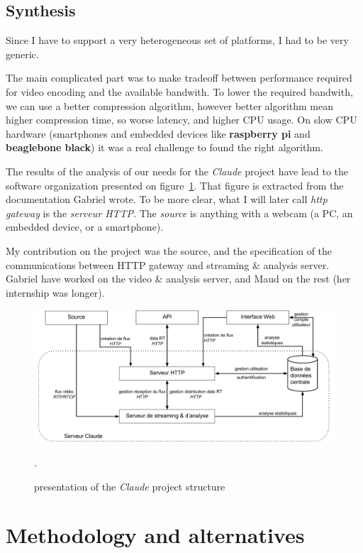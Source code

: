 \documentclass[a4paper,11pt]{custom}
\newcommand{\rpi}{\textbf{raspberry pi}\xspace}
\newcommand{\bbb}{\textbf{beaglebone black}\xspace}
\newcommand{\claude}{\textit{Claude}\xspace}
\begin{document}
\section{Synthesis}

Since I have to support a very heterogeneous set of platforms, I had to be very
generic.

The main complicated part was to make tradeoff between performance required for
video encoding and the available bandwith. To lower the required bandwith, we
can use a better compression algorithm, however better algorithm mean higher
compression time, so worse latency, and higher CPU usage. On slow CPU hardware
(smartphones and embedded devices like \rpi{} and \bbb{}) it was a real
challenge to found the right algorithm.

The results of the analysis of our needs for the \claude{} project have lead to
the software organization presented on figure~\ref{fig:architecture}. That figure
is extracted from the documentation Gabriel wrote. To be more clear, what I
will later call \textit{http gateway} is the \textit{serveur HTTP}. The \textit{source} is anything
with a webcam (a PC, an embedded device, or a smartphone).

My contribution on the project was the source, and the specification of the
communications between HTTP gateway and streaming \& analysis server. Gabriel
have worked on the video \& analysis server, and Maud on the rest (her internship
was longer).

\begin{figure}
  \centering
  \includegraphics[width=\textwidth]{architecture.jpg}
  \label{fig:architecture}
  \caption{presentation of the \claude{} project structure}.
\end{figure}

\chapter{Methodology and alternatives}
\label{sec:methodology}
\end{document}
